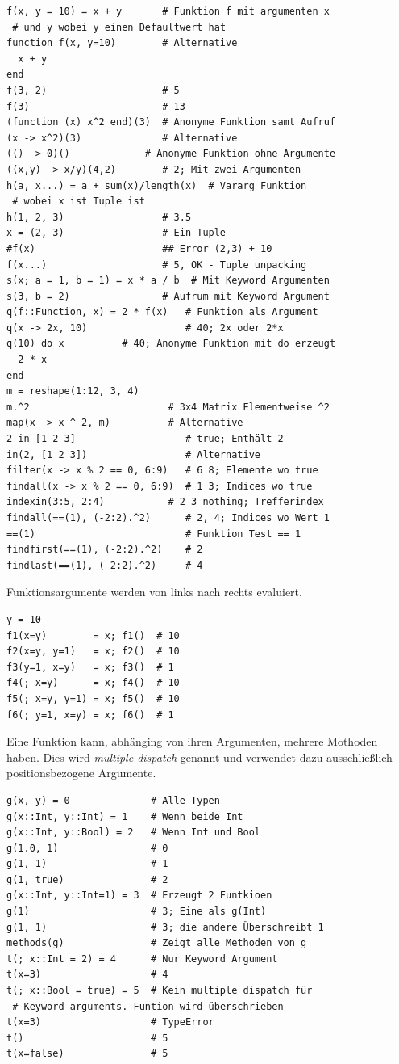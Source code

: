 \documentclass[10pt,twocolumn]{scrartcl}
\begin{document}
\begin{lstlisting}
f(x, y = 10) = x + y       # Funktion f mit argumenten x
 # und y wobei y einen Defaultwert hat
function f(x, y=10)        # Alternative
  x + y
end
f(3, 2)                    # 5
f(3)                       # 13
(function (x) x^2 end)(3)  # Anonyme Funktion samt Aufruf
(x -> x^2)(3)              # Alternative
(() -> 0)()             # Anonyme Funktion ohne Argumente
((x,y) -> x/y)(4,2)        # 2; Mit zwei Argumenten
h(a, x...) = a + sum(x)/length(x)  # Vararg Funktion
 # wobei x ist Tuple ist
h(1, 2, 3)                 # 3.5
x = (2, 3)                 # Ein Tuple
#f(x)                      ## Error (2,3) + 10
f(x...)                    # 5, OK - Tuple unpacking
s(x; a = 1, b = 1) = x * a / b  # Mit Keyword Argumenten
s(3, b = 2)                # Aufrum mit Keyword Argument
q(f::Function, x) = 2 * f(x)   # Funktion als Argument
q(x -> 2x, 10)                 # 40; 2x oder 2*x
q(10) do x          # 40; Anonyme Funktion mit do erzeugt
  2 * x
end
m = reshape(1:12, 3, 4)
m.^2                        # 3x4 Matrix Elementweise ^2
map(x -> x ^ 2, m)          # Alternative
2 in [1 2 3]                   # true; Enthält 2
in(2, [1 2 3])                 # Alternative
filter(x -> x % 2 == 0, 6:9)   # 6 8; Elemente wo true
findall(x -> x % 2 == 0, 6:9)  # 1 3; Indices wo true
indexin(3:5, 2:4)           # 2 3 nothing; Trefferindex
findall(==(1), (-2:2).^2)      # 2, 4; Indices wo Wert 1
==(1)                          # Funktion Test == 1
findfirst(==(1), (-2:2).^2)    # 2
findlast(==(1), (-2:2).^2)     # 4
\end{lstlisting}

Funktionsargumente werden von links nach rechts evaluiert.

\begin{lstlisting}
y = 10
f1(x=y)        = x; f1()  # 10
f2(x=y, y=1)   = x; f2()  # 10
f3(y=1, x=y)   = x; f3()  # 1
f4(; x=y)      = x; f4()  # 10
f5(; x=y, y=1) = x; f5()  # 10
f6(; y=1, x=y) = x; f6()  # 1
\end{lstlisting}

Eine Funktion kann, abhänging von ihren Argumenten, mehrere Mothoden haben. Dies wird \emph{multiple dispatch} genannt und verwendet dazu ausschließlich positionsbezogene Argumente.

\begin{lstlisting}
g(x, y) = 0              # Alle Typen
g(x::Int, y::Int) = 1    # Wenn beide Int
g(x::Int, y::Bool) = 2   # Wenn Int und Bool
g(1.0, 1)                # 0
g(1, 1)                  # 1
g(1, true)               # 2
g(x::Int, y::Int=1) = 3  # Erzeugt 2 Funtkioen
g(1)                     # 3; Eine als g(Int)
g(1, 1)                  # 3; die andere Überschreibt 1
methods(g)               # Zeigt alle Methoden von g
t(; x::Int = 2) = 4      # Nur Keyword Argument
t(x=3)                   # 4
t(; x::Bool = true) = 5  # Kein multiple dispatch für
 # Keyword arguments. Funtion wird überschrieben
t(x=3)                   # TypeError
t()                      # 5
t(x=false)               # 5
\end{lstlisting}
\end{document}
